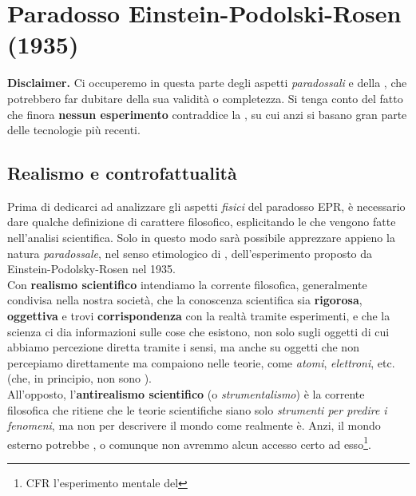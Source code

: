 \documentclass[../../FisicaTeorica.tex]{subfiles}
\begin{document}
\section{Paradosso Einstein-Podolski-Rosen (1935)}

\textbf{Disclaimer.} Ci occuperemo in questa parte degli aspetti \textit{paradossali} e  della \MQ, che potrebbero far dubitare della sua validità o completezza. Si tenga conto del fatto che finora \textbf{nessun esperimento} contraddice la \MQ, su cui anzi si basano gran parte delle tecnologie più recenti.\\

\subsection{Realismo e controfattualità}
Prima di dedicarci ad analizzare gli aspetti \textit{fisici} del paradosso EPR, è necessario dare qualche definizione di carattere filosofico, esplicitando le  che vengono fatte nell'analisi scientifica. Solo in questo modo sarà possibile apprezzare appieno la natura \textit{paradossale}, nel senso etimologico di , dell'esperimento proposto da Einstein-Podolsky-Rosen nel 1935.\\

Con \textbf{realismo scientifico} intendiamo la corrente filosofica, generalmente condivisa nella nostra società, che la conoscenza scientifica sia \textbf{rigorosa}, \textbf{oggettiva} e trovi \textbf{corrispondenza} con la realtà tramite esperimenti, e che la scienza ci dia informazioni sulle cose che esistono, non solo sugli oggetti di cui abbiamo percezione diretta tramite i sensi, ma anche su oggetti che non percepiamo direttamente ma compaiono nelle teorie, come \textit{atomi}, \textit{elettroni}, etc. (che, in principio, non sono ).\\
All'opposto, l'\textbf{antirealismo scientifico} (o \textit{strumentalismo}) è la corrente filosofica che ritiene che le teorie scientifiche siano solo \textit{strumenti per predire i fenomeni}, ma non per descrivere il mondo come realmente è. Anzi, il mondo esterno potrebbe , o comunque non avremmo alcun accesso certo ad esso\footnote{CFR l'esperimento mentale del }.\\
\end{document}
